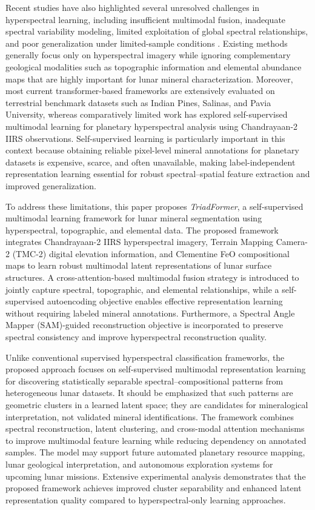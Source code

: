 \documentclass[pdflatex,sn-mathphys-num]{sn-jnl}
\begin{document}
Recent studies have also highlighted several unresolved challenges in hyperspectral learning, including insufficient multimodal fusion, inadequate spectral variability modeling, limited exploitation of global spectral relationships, and poor generalization under limited-sample conditions \cite{ref16,ref17,ref18}. Existing methods generally focus only on hyperspectral imagery while ignoring complementary geological modalities such as topographic information and elemental abundance maps that are highly important for lunar mineral characterization. Moreover, most current transformer-based frameworks are extensively evaluated on terrestrial benchmark datasets such as Indian Pines, Salinas, and Pavia University, whereas comparatively limited work has explored self-supervised multimodal learning for planetary hyperspectral analysis using Chandrayaan-2 IIRS observations. Self-supervised learning is particularly important in this context because obtaining reliable pixel-level mineral annotations for planetary datasets is expensive, scarce, and often unavailable, making label-independent representation learning essential for robust spectral--spatial feature extraction and improved generalization.

To address these limitations, this paper proposes \textit{TriadFormer}, a self-supervised multimodal learning framework for lunar mineral segmentation using hyperspectral, topographic, and elemental data. The proposed framework integrates Chandrayaan-2 IIRS hyperspectral imagery, Terrain Mapping Camera-2 (TMC-2) digital elevation information, and Clementine FeO compositional maps to learn robust multimodal latent representations of lunar surface structures. A cross-attention-based multimodal fusion strategy is introduced to jointly capture spectral, topographic, and elemental relationships, while a self-supervised autoencoding objective enables effective representation learning without requiring labeled mineral annotations. Furthermore, a Spectral Angle Mapper (SAM)-guided reconstruction objective is incorporated to preserve spectral consistency and improve hyperspectral reconstruction quality.

Unlike conventional supervised hyperspectral classification frameworks, the proposed approach focuses on self-supervised multimodal representation learning for discovering statistically separable spectral--compositional patterns from heterogeneous lunar datasets. It should be emphasized that such patterns are geometric clusters in a learned latent space; they are candidates for mineralogical interpretation, not validated mineral identifications. The framework combines spectral reconstruction, latent clustering, and cross-modal attention mechanisms to improve multimodal feature learning while reducing dependency on annotated samples. The model may support future automated planetary resource mapping, lunar geological interpretation, and autonomous exploration systems for upcoming lunar missions. Extensive experimental analysis demonstrates that the proposed framework achieves improved cluster separability and enhanced latent representation quality compared to hyperspectral-only learning approaches.
\end{document}

